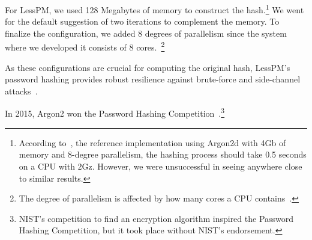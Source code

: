 For LessPM, we used 128 Megabytes of memory to construct the hash.\footnote{
  According to~\cite{argon2specs}, the reference implementation using Argon2d
  with 4Gb of memory and 8-degree parallelism, the hashing process should take
  0.5 seconds on a CPU with 2Gz. However, we were unsuccessful in seeing
  anywhere close to similar results.
}
We went for the default suggestion of two iterations to complement the memory.
To finalize the configuration, we added 8 degrees of parallelism since the
system where we developed it consists of 8 cores.~\footnote{
  The degree of parallelism is affected by how many cores a CPU
  contains~\cite{argon2specs}.
}

As these configurations are crucial for computing the original hash, LessPM's
password hashing provides robust resilience against brute-force and side-channel
attacks~\cite{argon2specs}.

In 2015, Argon2 won the Password Hashing
Competition~\cite{passwordhashing}.\footnote{
  NIST's competition to find an encryption algorithm inspired the Password
  Hashing Competition, but it took place without NIST's endorsement.
}